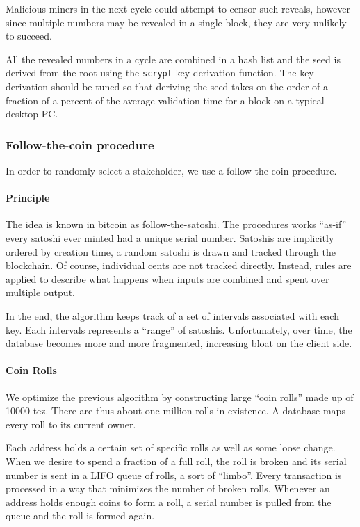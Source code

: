 \documentclass[letterpaper]{article}
\begin{document}
Malicious miners in the next cycle could attempt to censor such reveals, however
since multiple numbers may be revealed in a single block, they are very unlikely
to succeed.

All the revealed numbers in a cycle are combined in a hash list and the seed is
derived  from the root using the \verb!scrypt! key derivation function. The key
derivation should be tuned so that deriving the seed takes on the order of a
fraction of a percent of the average validation time for a block on a typical
desktop PC.

\subsubsection{Follow-the-coin procedure}

In order to randomly select a stakeholder, we use a follow the coin procedure.

\paragraph{Principle}
The idea is known in bitcoin as follow-the-satoshi. The procedures works
``as-if'' every satoshi ever minted had a unique serial number. Satoshis are
implicitly ordered by creation time, a random satoshi is drawn and tracked
through the blockchain. Of course, individual cents are not tracked directly.
Instead, rules are applied to describe what happens when inputs are combined and
spent over multiple output.

In the end, the algorithm keeps track of a set of intervals associated with each
key. Each intervals represents a ``range'' of satoshis.
Unfortunately, over time, the database becomes more and more fragmented,
increasing bloat on the client side.

\paragraph{Coin Rolls}
We optimize the previous algorithm by constructing large ``coin rolls'' made up
of \num{10000} tez. There are thus about one million rolls in existence. A
database maps every roll to its current owner.

Each address holds a certain set of specific rolls as well as some loose change.
When we desire to spend a fraction of a full roll, the roll is broken and
its serial number is sent in a LIFO queue of rolls, a sort of ``limbo''. Every
transaction is processed in a way that minimizes the number of broken rolls.
Whenever an address holds enough coins to form a roll, a serial number is pulled
from the queue and the roll is formed again.
\end{document}
